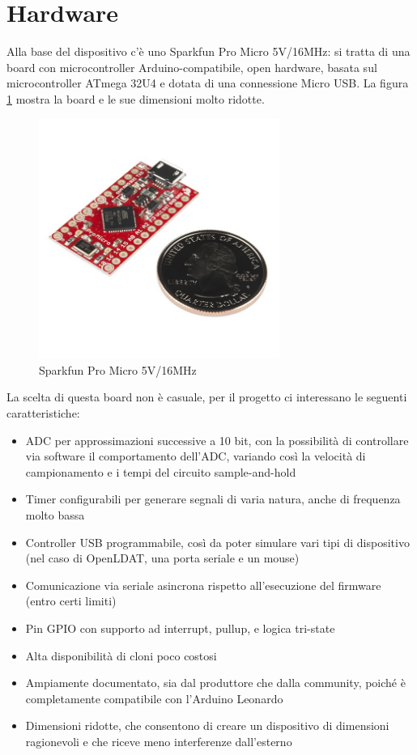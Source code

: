 \section{Hardware}
Alla base del dispositivo c'è uno Sparkfun Pro Micro 5V/16MHz: si tratta di una board con microcontroller Arduino-compatibile, open hardware, basata sul microcontroller ATmega 32U4 e dotata di una connessione Micro USB. La figura \ref{fig:sparkfun_promicro} mostra la board e le sue dimensioni molto ridotte.
\begin{figure}[h]
	\centering
	\includegraphics[width=0.7\textwidth]{Chapter03/res/sparkfun_promicro.jpg}
	\caption{Sparkfun Pro Micro 5V/16MHz}
	\label{fig:sparkfun_promicro}
\end{figure}

La scelta di questa board non è casuale, per il progetto ci interessano le seguenti caratteristiche:
\begin{itemize}
	\item ADC per approssimazioni successive a 10 bit, con la possibilità di controllare via software il comportamento dell'ADC, variando così la velocità di campionamento e i tempi del circuito sample-and-hold
	\item Timer configurabili per generare segnali di varia natura, anche di frequenza molto bassa
	\item Controller USB programmabile, così da poter simulare vari tipi di dispositivo (nel caso di OpenLDAT, una porta seriale e un mouse)
	\item Comunicazione via seriale asincrona rispetto all'esecuzione del firmware (entro certi limiti)
	\item Pin GPIO con supporto ad interrupt, pullup, e logica tri-state
	\item Alta disponibilità di cloni poco costosi
	\item Ampiamente documentato, sia dal produttore che dalla community, poiché è completamente compatibile con l'Arduino Leonardo
	\item Dimensioni ridotte, che consentono di creare un dispositivo di dimensioni ragionevoli e che riceve meno interferenze dall'esterno
\end{itemize}

